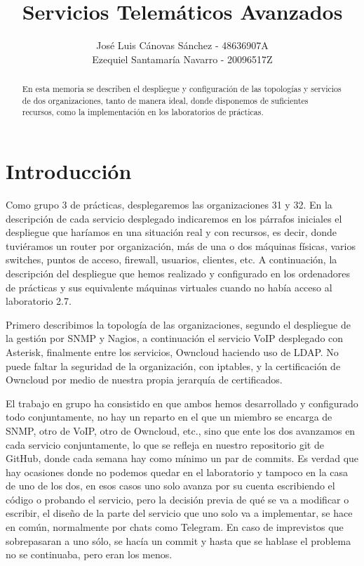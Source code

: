 \documentclass[]{article}
\title{Servicios Telemáticos Avanzados}
\author{José Luis Cánovas Sánchez - 48636907A\\Ezequiel Santamaría Navarro - 20096517Z}
\begin{document}
\maketitle

\begin{abstract}
En esta memoria se describen el despliegue y configuración de las topologías y servicios de dos organizaciones, tanto de manera ideal, donde disponemos de suficientes recursos, como la implementación en los laboratorios de prácticas.
\end{abstract}

\tableofcontents


\section{Introducción}

Como grupo 3 de prácticas, desplegaremos las organizaciones 31 y 32. En la descripción de cada servicio desplegado indicaremos en los párrafos iniciales el despliegue que haríamos en una situación real y con recursos, es decir, donde tuviéramos un router por organización, más de una o dos máquinas físicas, varios switches, puntos de acceso, firewall, usuarios, clientes, etc. A continuación, la descripción del despliegue que hemos realizado y configurado en los ordenadores de prácticas y sus equivalente máquinas virtuales cuando no había acceso al laboratorio 2.7.

Primero describimos la topología de las organizaciones, segundo el despliegue de la gestión por SNMP y Nagios, a continuación el servicio VoIP desplegado con Asterisk, finalmente entre los servicios, Owncloud haciendo uso de LDAP. No puede faltar la seguridad de la organización, con iptables, y la certificación de Owncloud por medio de nuestra propia jerarquía de certificados.

El trabajo en grupo ha consistido en que ambos hemos desarrollado y configurado todo conjuntamente, no hay un reparto en el que un miembro se encarga de SNMP, otro de VoIP, otro de Owncloud, etc., sino que ente los dos avanzamos en cada servicio conjuntamente, lo que se refleja en nuestro repositorio git de GitHub, donde cada semana hay como mínimo un par de commits. Es verdad que hay ocasiones donde no podemos quedar en el laboratorio y tampoco en la casa de uno de los dos, en esos casos uno solo avanza por su cuenta escribiendo el código o probando el servicio, pero la decisión previa de qué se va a modificar o escribir, el diseño de la parte del servicio que uno solo va a implementar, se hace en común, normalmente por chats como Telegram. En caso de imprevistos que sobrepasaran a uno sólo, se hacía un commit y hasta que se hablase el problema no se continuaba, pero eran los menos.
\end{document}
